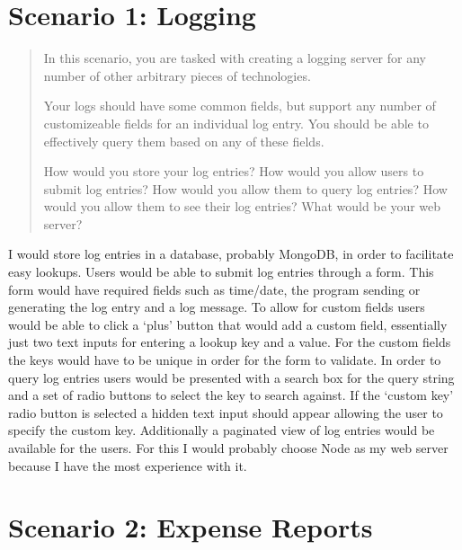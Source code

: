 \documentclass[12pt, letterpaper]{homework}
\author{Bradford Smith}
\title{}
\date{\today}
\begin{document}
\maketitle

\section*{Scenario 1: Logging}

\begin{quote}
    In this scenario, you are tasked with creating a logging server for any number
    of other arbitrary pieces of technologies.

    Your logs should have some common fields, but support any number of
    customizeable fields for an individual log entry. You should be able to
    effectively query them based on any of these fields.

    How would you store your log entries? How would you allow users to submit log
    entries? How would you allow them to query log entries? How would you allow them
    to see their log entries? What would be your web server?
\end{quote}

I would store log entries in a database, probably MongoDB, in order to
facilitate easy lookups. Users would be able to submit log entries through a
form. This form would have required fields such as time/date, the program
sending or generating the log entry and a log message. To allow for custom
fields users would be able to click a `plus' button that would add a custom
field, essentially just two text inputs for entering a lookup key and a value.
For the custom fields the keys would have to be unique in order for the form to
validate. In order to query log entries users would be presented with a search
box for the query string and a set of radio buttons to select the key to search
against. If the `custom key' radio button is selected a hidden text input should
appear allowing the user to specify the custom key. Additionally a paginated
view of log entries would be available for the users. For this I would probably
choose Node as my web server because I have the most experience with it.

\pagebreak{}
\section*{Scenario 2: Expense Reports}
\end{document}
